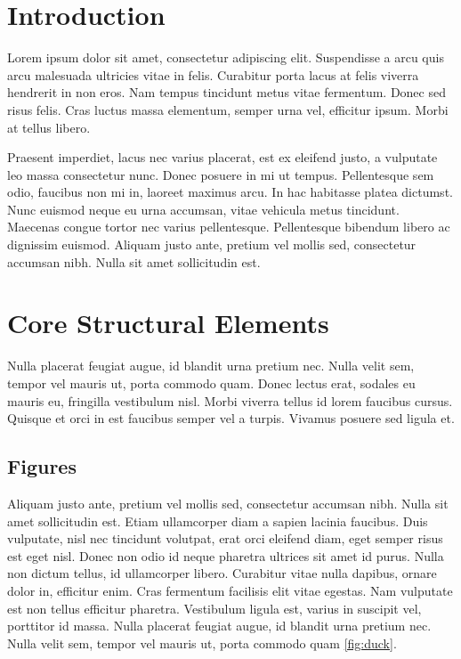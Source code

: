 \documentclass[sigconf, nonacm]{acmart}
\begin{document}
\section{Introduction}

Lorem ipsum dolor sit amet, consectetur adipiscing elit. Suspendisse a arcu quis arcu malesuada ultricies vitae in felis. Curabitur porta lacus at felis viverra hendrerit in non eros. Nam tempus tincidunt metus vitae fermentum. Donec sed risus felis. Cras luctus massa elementum, semper urna vel, efficitur ipsum. Morbi at tellus libero.

Praesent imperdiet, lacus nec varius placerat, est ex eleifend justo, a vulputate leo massa consectetur nunc. Donec posuere in mi ut tempus. Pellentesque sem odio, faucibus non mi in, laoreet maximus arcu. In hac habitasse platea dictumst. Nunc euismod neque eu urna accumsan, vitae vehicula metus tincidunt. Maecenas congue tortor nec varius pellentesque. Pellentesque bibendum libero ac dignissim euismod. Aliquam justo ante, pretium vel mollis sed, consectetur accumsan nibh. Nulla sit amet sollicitudin est. 

\section{Core Structural Elements}

Nulla placerat feugiat augue, id blandit urna pretium nec. Nulla velit sem, tempor vel mauris ut, porta commodo quam. Donec lectus erat, sodales eu mauris eu, fringilla vestibulum nisl. Morbi viverra tellus id lorem faucibus cursus. Quisque et orci in est faucibus semper vel a turpis. Vivamus posuere sed ligula et. 

\subsection{Figures}

Aliquam justo ante, pretium vel mollis sed, consectetur accumsan nibh. Nulla sit amet sollicitudin est. Etiam ullamcorper diam a sapien lacinia faucibus. Duis vulputate, nisl nec tincidunt volutpat, erat orci eleifend diam, eget semper risus est eget nisl. Donec non odio id neque pharetra ultrices sit amet id purus. Nulla non dictum tellus, id ullamcorper libero. Curabitur vitae nulla dapibus, ornare dolor in, efficitur enim. Cras fermentum facilisis elit vitae egestas. Nam vulputate est non tellus efficitur pharetra. Vestibulum ligula est, varius in suscipit vel, porttitor id massa. Nulla placerat feugiat augue, id blandit urna pretium nec. Nulla velit sem, tempor vel mauris ut, porta commodo quam \autoref{fig:duck}.
\end{document}
